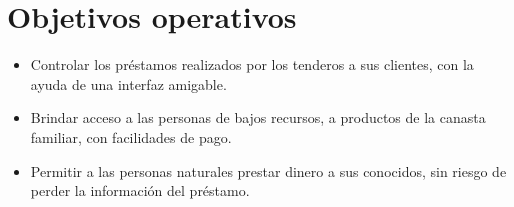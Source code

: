 \section{Objetivos operativos}

\begin{itemize}
	\item Controlar los préstamos realizados por los tenderos a sus clientes, con la ayuda  de una interfaz amigable.
	\item Brindar acceso a las personas de bajos recursos, a productos de la canasta familiar, con facilidades de pago.
	\item Permitir a las personas naturales prestar dinero a sus conocidos, sin riesgo de perder la información del préstamo.
\end{itemize}